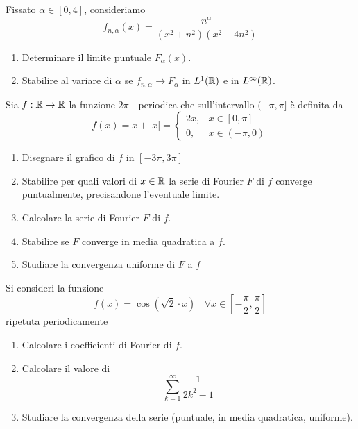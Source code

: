Fissato $\alpha \in [ 0, 4]$, consideriamo
\begin{equation*}
f_{n, \alpha}(x) = \frac{n^{\alpha}}{\left(x^{2} + n^{2}\right)\left(x^{2} + 4n^{2}\right)}
\end{equation*}
\begin{enumerate}
\item Determinare il limite puntuale $F_{\alpha}(x)$.
\item Stabilire al variare di $\alpha $ se $f_{n, \alpha}\rightarrow F_{\alpha}$ in $L^{1}(\mathbb{R})$ e in $L^{\infty}(\mathbb{R})$.
\end{enumerate}
\Esercizio{}

Sia $f:\mathbb{R} \rightarrow \mathbb{R} $ la funzione $2\pi $ - periodica che sull'intervallo $(- \pi, \pi ]$ è definita da
\begin{equation*}
f(x) = x + | x| = 
\begin{cases}
2x, & x\in [ 0, \pi ]\\
0, & x\in (- \pi, 0)
\end{cases}
\end{equation*}
\begin{enumerate}
\item Disegnare il grafico di $f$ in $[ - 3\pi, 3\pi ]$
\item Stabilire per quali valori di $x\in \mathbb{R} $ la serie di Fourier $F$ di $f$ converge puntualmente, precisandone l'eventuale limite.
\item Calcolare la serie di Fourier $F$ di $f$.
\item Stabilire se $F$ converge in media quadratica a $f$.
\item Studiare la convergenza uniforme di $F$ a $f$
\end{enumerate}
\Esercizio{}

Si consideri la funzione
\begin{equation*}
f(x) = \cos\left(\sqrt{2} \cdot x\right) \ \ \ \ \forall x\in \left[ - \frac{\pi}{2}, \frac{\pi}{2}\right]
\end{equation*}
ripetuta periodicamente
\begin{enumerate}
\item Calcolare i coefficienti di Fourier di $f$.
\item Calcolare il valore di
\begin{equation*}
\sum\limits^{\infty}_{k = 1}\frac{1}{2k^{2} - 1}
\end{equation*}
\item Studiare la convergenza della serie (puntuale, in media quadratica, uniforme).
\end{enumerate}
\ParteSoluzioni
\Soluzione

